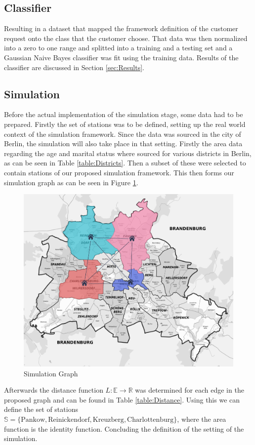 \subsection{Classifier}
\label{sub_sec:CaseStudy/Classifier}

Resulting in a dataset that mapped the framework definition of the customer request onto the class that the customer choose.
That data was then normalized into a zero to one range and splitted into a
training and a testing set and a Gaussian Naive Bayes classifier was fit using
the training data. Results of the classifier are discussed in Section \ref{sec:Results}.


\subsection{Simulation}
\label{sub_sec:CaseStudy/Simulation}

Before the actual implementation of the simulation stage, some data had to be prepared. Firstly 
the set of stations was to be defined, setting up the real world context of the simulation 
framework. Since the data was sourced in the city of Berlin, the simulation will also take place
in that setting. Firstly the area data regarding the age and marital status where sourced for various
districts in Berlin, as can be seen in Table \ref{table:Districts}. Then a subset of these were selected
to contain stations of our proposed simulation framework. This then forms our simulation graph as can be
seen in Figure \ref{fig:Graph}.
\begin{figure}[htbp]
  \centering
  \includegraphics[width=.5\linewidth]{./Figures/graph.png}
  \caption{Simulation Graph}
  \label{fig:Graph}
\end{figure}

Afterwards the distance function $L: \mathbb{E} \to \mathbb{R}$ was determined for each edge in the proposed graph and can be found
in Table \ref{table:Distance}. Using this we can define the set of stations $\mathbb{S} = \{ \text{Pankow}, \text{Reinickendorf}, \text{Kreuzberg}, \text{Charlottenburg} \}$,
where the area function is the identity function. Concluding the definition of the setting of the simulation.

